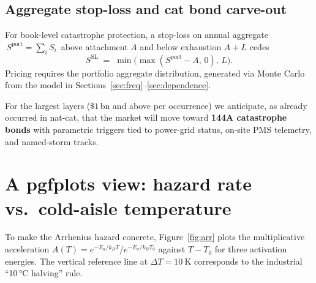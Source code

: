 \documentclass[11pt,a4paper]{article}
\let\origsection\section
\renewcommand{\section}{\clearpage\origsection}
\theoremstyle{ia}
\newcommand{\1}{\mathbf{1}}
\begin{document}
\subsection{Aggregate stop-loss and cat bond carve-out}

For book-level catastrophe protection, a stop-loss on annual aggregate
$\,S^{\mathrm{port}}=\sum_i S_i\,$ above attachment $A$ and below
exhaustion $A+L$ cedes
\begin{equation}\label{eq:stoploss}
   S^{\mathrm{SL}} \;=\; \min\bigl(\max(S^{\mathrm{port}} - A,\,0),\,L\bigr).
\end{equation}
Pricing requires the portfolio aggregate distribution, generated via
Monte Carlo from the model in
Sections~\ref{sec:freq}--\ref{sec:dependence}.

For the largest layers ($\$1$\,bn and above per occurrence) we
anticipate, as already occurred in nat-cat, that the market will move
toward \textbf{144A catastrophe bonds} with parametric triggers tied
to power-grid status, on-site PMS telemetry, and named-storm tracks.




\section{A pgfplots view: hazard rate vs.\ cold-aisle temperature}\label{sec:plot}

To make the Arrhenius hazard concrete, Figure~\ref{fig:arr} plots the
multiplicative acceleration $A(T)=e^{-E_a/k_B T}/e^{-E_a/k_B T_0}$
against $T-T_0$ for three activation energies. The vertical reference
line at $\Delta T=\SI{10}{\kelvin}$ corresponds to the industrial
``10\,°C halving'' rule.
\end{document}
